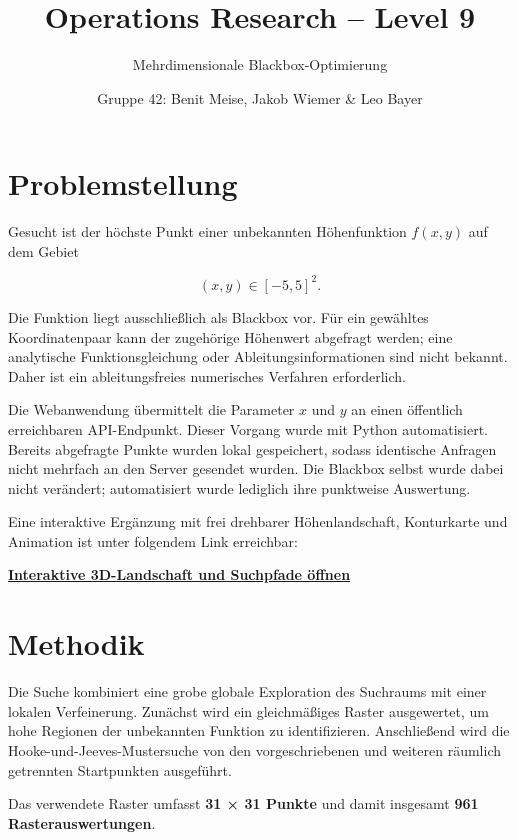 \documentclass[
  ngerman,
  10pt,
  a4paper,
]{article}
\title{Operations Research -- Level 9}
\subtitle{Mehrdimensionale Blackbox-Optimierung}
\author{Gruppe 42: Benit Meise, Jakob Wiemer \& Leo Bayer}
\date{}
\begin{document}
\maketitle


\section{Problemstellung}\label{problemstellung}

Gesucht ist der höchste Punkt einer unbekannten Höhenfunktion \(f(x,y)\)
auf dem Gebiet

\[
(x,y)\in[-5,5]^2.
\]

Die Funktion liegt ausschließlich als Blackbox vor. Für ein gewähltes
Koordinatenpaar kann der zugehörige Höhenwert abgefragt werden; eine
analytische Funktionsgleichung oder Ableitungsinformationen sind nicht
bekannt. Daher ist ein ableitungsfreies numerisches Verfahren
erforderlich.

Die Webanwendung übermittelt die Parameter \(x\) und \(y\) an einen
öffentlich erreichbaren API-Endpunkt. Dieser Vorgang wurde mit Python
automatisiert. Bereits abgefragte Punkte wurden lokal gespeichert,
sodass identische Anfragen nicht mehrfach an den Server gesendet wurden.
Die Blackbox selbst wurde dabei nicht verändert; automatisiert wurde
lediglich ihre punktweise Auswertung.

Eine interaktive Ergänzung mit frei drehbarer Höhenlandschaft,
Konturkarte und Animation ist unter folgendem Link erreichbar:

\href{https://leobayer.github.io/Wissenschaftliche-Arbeiten/Operations_Research_Level09/}{\textbf{Interaktive
3D-Landschaft und Suchpfade öffnen}}

\section{Methodik}\label{methodik}

Die Suche kombiniert eine grobe globale Exploration des Suchraums mit
einer lokalen Verfeinerung. Zunächst wird ein gleichmäßiges Raster
ausgewertet, um hohe Regionen der unbekannten Funktion zu
identifizieren. Anschließend wird die Hooke-und-Jeeves-Mustersuche von
den vorgeschriebenen und weiteren räumlich getrennten Startpunkten
ausgeführt.

Das verwendete Raster umfasst \textbf{31 × 31 Punkte} und damit
insgesamt \textbf{961 Rasterauswertungen}.
\end{document}
